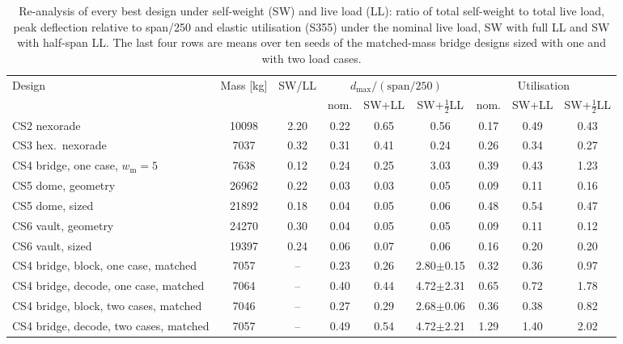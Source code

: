 \begin{table}[!htbp]
\centering
\footnotesize
\caption{Re-analysis of every best design under self-weight (SW) and live load (LL): ratio of total self-weight to total live load, peak deflection relative to span/250 and elastic utilisation (S355) under the nominal live load, SW with full LL and SW with half-span LL. The last four rows are means over ten seeds of the matched-mass bridge designs sized with one and with two load cases.}
\label{tab:loadcases}
\scriptsize
\setlength{\tabcolsep}{2.5pt}
\begin{tabular}{p{2.9cm}cccccccc}
\toprule
Design & Mass [kg] & SW/LL & \multicolumn{3}{c}{$d_{\max}/(\text{span}/250)$} & \multicolumn{3}{c}{Utilisation} \\
 & & & nom. & SW+LL & SW+$\tfrac12$LL & nom. & SW+LL & SW+$\tfrac12$LL \\
\midrule
CS2 nexorade & 10098 & 2.20 & 0.22 & 0.65 & 0.56 & 0.17 & 0.49 & 0.43 \\
CS3 hex.\ nexorade & 7037 & 0.32 & 0.31 & 0.41 & 0.24 & 0.26 & 0.34 & 0.27 \\
CS4 bridge, one case, $w_{\text{m}}=5$ & 7638 & 0.12 & 0.24 & 0.25 & 3.03 & 0.39 & 0.43 & 1.23 \\
CS5 dome, geometry & 26962 & 0.22 & 0.03 & 0.03 & 0.05 & 0.09 & 0.11 & 0.16 \\
CS5 dome, sized & 21892 & 0.18 & 0.04 & 0.05 & 0.06 & 0.48 & 0.54 & 0.47 \\
CS6 vault, geometry & 24270 & 0.30 & 0.04 & 0.05 & 0.05 & 0.09 & 0.11 & 0.12 \\
CS6 vault, sized & 19397 & 0.24 & 0.06 & 0.07 & 0.06 & 0.16 & 0.20 & 0.20 \\
\midrule
CS4 bridge, block, one case, matched & 7057 & -- & 0.23 & 0.26 & 2.80$\pm$0.15 & 0.32 & 0.36 & 0.97 \\
CS4 bridge, decode, one case, matched & 7064 & -- & 0.40 & 0.44 & 4.72$\pm$2.31 & 0.65 & 0.72 & 1.78 \\
CS4 bridge, block, two cases, matched & 7046 & -- & 0.27 & 0.29 & 2.68$\pm$0.06 & 0.36 & 0.38 & 0.82 \\
CS4 bridge, decode, two cases, matched & 7057 & -- & 0.49 & 0.54 & 4.72$\pm$2.21 & 1.29 & 1.40 & 2.02 \\
\bottomrule
\end{tabular}
\normalsize
\end{table}
